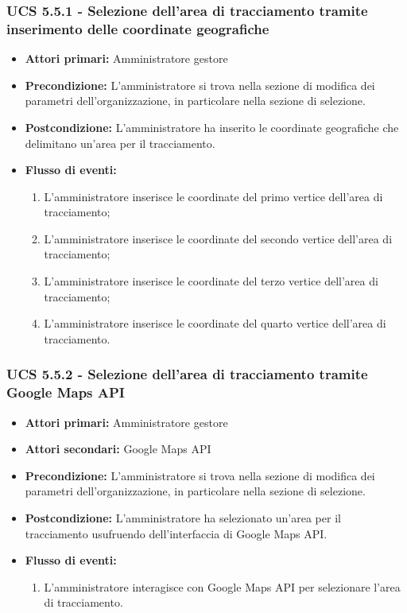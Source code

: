 \subsubsection{UCS 5.5.1 - Selezione dell'area di tracciamento tramite inserimento delle coordinate geografiche}%
\begin{itemize}
\item \textbf{Attori primari:} Amministratore gestore
\item \textbf{Precondizione:} L'amministratore si trova nella sezione di modifica dei parametri dell'organizzazione, in particolare nella sezione di selezione.
\item \textbf{Postcondizione:} L'amministratore ha inserito le coordinate geografiche che delimitano un'area per il tracciamento.
\item \textbf{Flusso di eventi:}
\begin{enumerate}
    \item L'amministratore inserisce le coordinate del primo vertice dell'area di tracciamento;
    \item L'amministratore inserisce le coordinate del secondo vertice dell'area di tracciamento;
    \item L'amministratore inserisce le coordinate del terzo vertice dell'area di tracciamento;
    \item L'amministratore inserisce le coordinate del quarto vertice dell'area di tracciamento.
\end{enumerate}
\end{itemize}

\subsubsection{UCS 5.5.2 - Selezione dell'area di tracciamento tramite Google Maps API}%
\begin{itemize}
\item \textbf{Attori primari:} Amministratore gestore
\item \textbf{Attori secondari:} Google Maps API
\item \textbf{Precondizione:} L'amministratore si trova nella sezione di modifica dei parametri dell'organizzazione, in particolare nella sezione di selezione.
\item \textbf{Postcondizione:} L'amministratore ha selezionato un'area per il tracciamento usufruendo dell'interfaccia di Google Maps API.
\item \textbf{Flusso di eventi:}
\begin{enumerate}
    \item L'amministratore interagisce con Google Maps API per selezionare l'area di tracciamento.
\end{enumerate}
\end{itemize}

